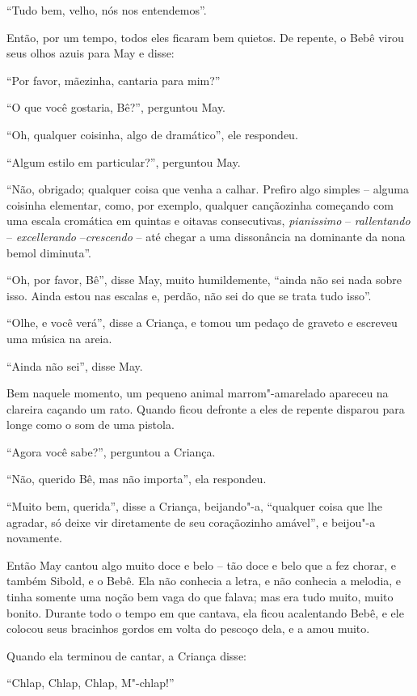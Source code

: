 ``Tudo bem, velho, nós nos entendemos''.

Então, por um tempo, todos eles ficaram bem quietos. De repente, o Bebê
virou seus olhos azuis para May e disse:

``Por favor, mãezinha, cantaria para mim?''

``O que você gostaria, Bê?'', perguntou May.

``Oh, qualquer coisinha, algo de dramático'', ele respondeu.

``Algum estilo em particular?'', perguntou May.

``Não, obrigado; qualquer coisa que venha a calhar. Prefiro algo simples
-- alguma coisinha elementar, como, por exemplo, qualquer cançãozinha
começando com uma escala cromática em quintas e oitavas consecutivas,
\emph{pianissimo} -- \emph{rallentando} -- \emph{excellerando}
--\emph{crescendo} -- até chegar a uma dissonância na dominante da nona
bemol diminuta''.

``Oh, por favor, Bê'', disse May, muito humildemente, ``ainda não sei
nada sobre isso. Ainda estou nas escalas e, perdão, não sei do que se
trata tudo isso''.

``Olhe, e você verá'', disse a Criança, e tomou um pedaço de graveto e
escreveu uma música na areia.

``Ainda não sei'', disse May.

Bem naquele momento, um pequeno animal marrom"-amarelado apareceu na
clareira caçando um rato. Quando ficou defronte a eles de repente
disparou para longe como o som de uma pistola.

``Agora você sabe?'', perguntou a Criança.

``Não, querido Bê, mas não importa'', ela respondeu.

``Muito bem, querida'', disse a Criança, beijando"-a, ``qualquer coisa
que lhe agradar, só deixe vir diretamente de seu coraçãozinho amável'',
e beijou"-a novamente.

Então May cantou algo muito doce e belo -- tão doce e belo que a fez
chorar, e também Sibold, e o Bebê. Ela não conhecia a letra, e não
conhecia a melodia, e tinha somente uma noção bem vaga do que falava;
mas era tudo muito, muito bonito. Durante todo o tempo em que cantava,
ela ficou acalentando Bebê, e ele colocou seus bracinhos gordos em volta
do pescoço dela, e a amou muito.

Quando ela terminou de cantar, a Criança disse:

``Chlap, Chlap, Chlap, M"-chlap!''

